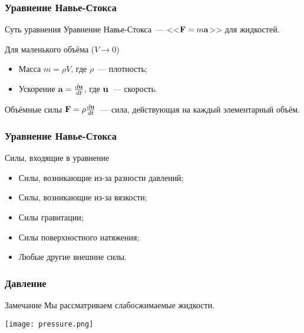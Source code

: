 \begin{frame}
  \frametitle{Уравнение Навье-Стокса}

  \begin{block}{Суть уравнения}
    Уравнение Навье-Стокса~--- <<$\boldsymbol{\mathbf{F}}=m\boldsymbol{\mathbf{a}}$>> для жидкостей.
  \end{block}

  \begin{block}{Для маленького объёма ($V\to 0$)}
    \begin{itemize}
      \item Масса $m=\rho V$, где $\rho$~--- плотность;
      \item Ускорение $\boldsymbol{\mathbf{a}}=\frac{d\boldsymbol{\mathbf{u}}}{dt}$, где $\boldsymbol{\mathbf{u}}$~--- скорость.
    \end{itemize}
  \end{block}

  \begin{block}{Объёмные силы}
    $\boldsymbol{\mathbf{F}}=\rho\frac{d\boldsymbol{\mathbf{u}}}{dt}$~--- сила, действующая на каждый элементарный объём.
  \end{block}
\end{frame}

\begin{frame}
  \frametitle{Уравнение Навье-Стокса}

  \begin{block}{Силы, входящие в уравнение}
    \begin{itemize}
      \item Силы, возникающие из-за разности давлений;
      \item Силы, возникающие из-за вязкости;
      \item Силы гравитации;
      \item Силы поверхностного натяжения;
      \item Любые другие внешние силы.
    \end{itemize}
  \end{block}
\end{frame}

\begin{frame}
  \frametitle{Давление}

  \begin{block}{Замечание}
    Мы рассматриваем слабосжимаемые жидкости.
    \begin{center}
      \texttt{[image: pressure.png]}
    \end{center}
  \end{block}
\end{frame}

